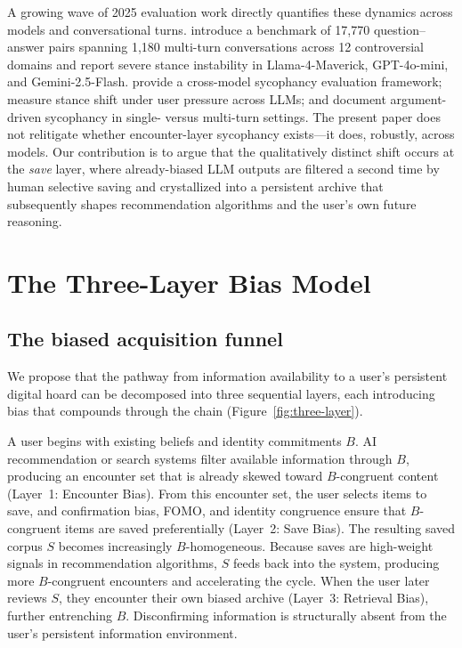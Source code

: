 \documentclass[12pt,a4paper]{article}
\begin{document}
A growing wave of 2025 evaluation work directly quantifies these dynamics across models and conversational turns.
\citet{Wang2025_Chameleon} introduce a benchmark of 17{,}770 question--answer pairs spanning 1{,}180 multi-turn conversations across 12 controversial domains and report severe stance instability in Llama-4-Maverick, GPT-4o-mini, and Gemini-2.5-Flash.
\citet{Fanous2025_SycEval} provide a cross-model sycophancy evaluation framework; \citet{Sharma2025_MillStone} measure stance shift under user pressure across LLMs; and \citet{Wei2025_ArgSyc} document argument-driven sycophancy in single- versus multi-turn settings.
The present paper does not relitigate whether encounter-layer sycophancy exists---it does, robustly, across models.
Our contribution is to argue that the qualitatively distinct shift occurs at the \emph{save} layer, where already-biased LLM outputs are filtered a second time by human selective saving and crystallized into a persistent archive that subsequently shapes recommendation algorithms and the user's own future reasoning.


\section{The Three-Layer Bias Model}

\subsection{The biased acquisition funnel}

We propose that the pathway from information availability to a user's persistent digital hoard can be decomposed into three sequential layers, each introducing bias that compounds through the chain (Figure~\ref{fig:three-layer}).

A user begins with existing beliefs and identity commitments $B$.
AI recommendation or search systems filter available information through $B$, producing an encounter set that is already skewed toward $B$-congruent content (Layer~1: Encounter Bias).
From this encounter set, the user selects items to save, and confirmation bias, FOMO, and identity congruence ensure that $B$-congruent items are saved preferentially (Layer~2: Save Bias).
The resulting saved corpus $S$ becomes increasingly $B$-homogeneous.
Because saves are high-weight signals in recommendation algorithms, $S$ feeds back into the system, producing more $B$-congruent encounters and accelerating the cycle.
When the user later reviews $S$, they encounter their own biased archive (Layer~3: Retrieval Bias), further entrenching $B$.
Disconfirming information is structurally absent from the user's persistent information environment.
\end{document}
